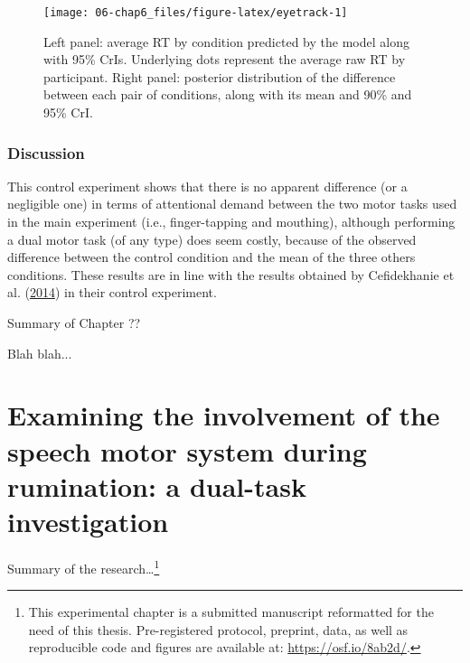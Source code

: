 \documentclass[a4paper,12pt,twoside,openright,oldfontcommands]{memoir}
\let\rmarkdownfootnote\footnote%
\def\footnote{\protect\rmarkdownfootnote}
\newcommand\getcurrentref[1]{
 \ifnumequal{\value{#1}}{0}
  {??}
  {\the\value{#1}}
}
\begin{document}
\begin{figure}[H]
\texttt{[image: 06-chap6\_files/figure-latex/eyetrack-1]} \caption{Left panel: average RT by condition predicted by the model along with 95\% CrIs. Underlying dots represent the average raw RT by participant. Right panel: posterior distribution of the difference between each pair of conditions, along with its mean and 90\% and 95\% CrI.}\label{fig:eyetrack}
\end{figure}

\hypertarget{discussion-4}{%
\subsection{Discussion}\label{discussion-4}}

This control experiment shows that there is no apparent difference (or a negligible one) in terms of attentional demand between the two motor tasks used in the main experiment (i.e., finger-tapping and mouthing), although performing a dual motor task (of any type) does seem costly, because of the observed difference between the control condition and the mean of the three others conditions. These results are in line with the results obtained by Cefidekhanie et al. (\protect\hyperlink{ref-cefidekhanie_interaction_2014}{2014}) in their control experiment.

\newpage

\begin{vplace}[1]

\begin{summary}{Summary of Chapter\getcurrentref{chapter}}

Blah blah...

\end{summary}

\end{vplace}

\hypertarget{examining-the-involvement-of-the-speech-motor-system-during-rumination-a-dual-task-investigation}{%
\chapter{Examining the involvement of the speech motor system during rumination: a dual-task investigation}\label{examining-the-involvement-of-the-speech-motor-system-during-rumination-a-dual-task-investigation}}

Summary of the research\ldots{}\footnote{This experimental chapter is a submitted manuscript reformatted for the need of this thesis. Pre-registered protocol, preprint, data, as well as reproducible code and figures are available at: \url{https://osf.io/8ab2d/}.}
\end{document}
